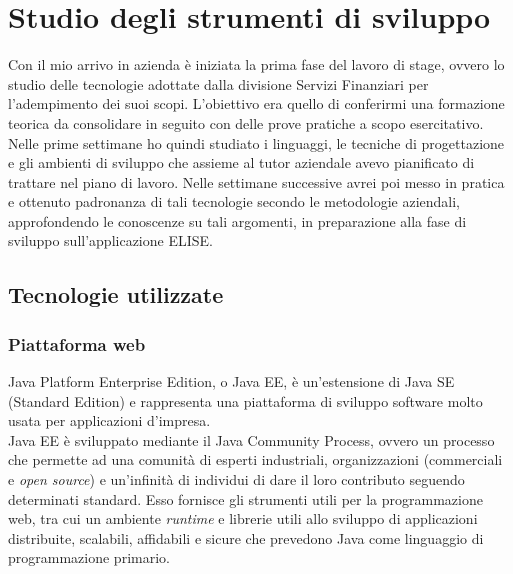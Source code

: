 \section{Studio degli strumenti di sviluppo}

Con il mio arrivo in azienda è iniziata la prima fase del lavoro di stage, ovvero lo studio delle tecnologie adottate dalla divisione Servizi Finanziari per l'adempimento dei suoi scopi. L'obiettivo era quello di conferirmi una formazione teorica da consolidare in seguito con delle prove pratiche a scopo esercitativo.\\

Nelle prime settimane ho quindi studiato i linguaggi, le tecniche di progettazione e gli ambienti di sviluppo che assieme al tutor aziendale avevo pianificato di trattare nel piano di lavoro. Nelle settimane successive avrei poi messo in pratica e ottenuto padronanza di tali tecnologie secondo le metodologie aziendali, approfondendo le conoscenze su tali argomenti, in preparazione alla fase di sviluppo sull'applicazione ELISE.

	\newpage

	\subsection{Tecnologie utilizzate}

	\subsubsection{Piattaforma web}
	Java Platform Enterprise Edition, o Java EE, è un'estensione di Java SE (Standard Edition) e rappresenta una piattaforma di sviluppo software molto usata per applicazioni d'impresa.\\
	
	Java EE è sviluppato mediante il Java Community Process, ovvero un processo che permette ad una comunità di esperti industriali, organizzazioni (commerciali e \textit{open source}) e un'infinità di individui di dare il loro contributo seguendo determinati standard. Esso fornisce gli strumenti utili per la programmazione web, tra cui un ambiente \textit{runtime} e librerie utili allo sviluppo di applicazioni distribuite, scalabili, affidabili e sicure che prevedono Java come linguaggio di programmazione primario.\\
	
